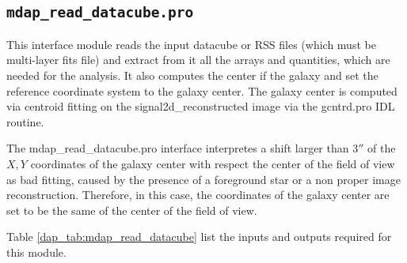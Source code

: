 \subsection{{\tt mdap\_read\_datacube.pro}}
\label{dap_sec:mdap_read_datacube}

This interface module reads the input datacube or RSS files (which
must be multi-layer fits file) and extract from it all the arrays and
quantities, which are needed for the analysis. It also computes the
center if the galaxy and set the reference coordinate system to the
galaxy center. The galaxy center is computed via centroid fitting on
the signal2d\_reconstructed image via the gcntrd.pro IDL routine.


The mdap\_read\_datacube.pro interface interpretes a shift larger than
$3''$ of the $X,Y$ coordinates of the galaxy center with respect the
center of the field of view as bad fitting, caused by the presence of
a foreground star or a non proper image reconstruction. Therefore, in
this case, the coordinates of the galaxy center are set to be the same
of the center of the field of view.


Table \ref{dap_tab:mdap_read_datacube} list the inputs and
outputs required for this module.



